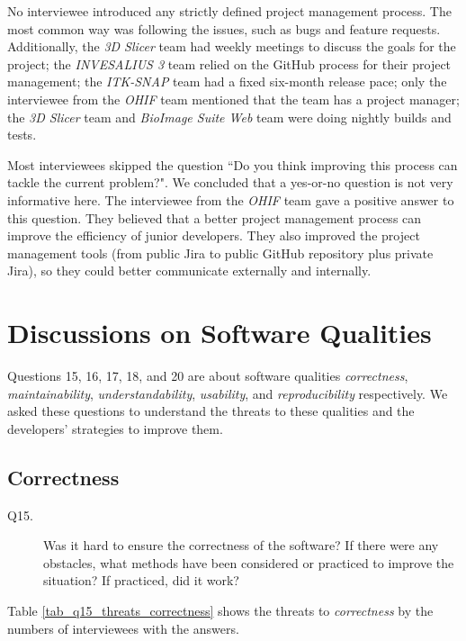 No interviewee introduced any strictly defined project management process. The most common way was following the issues, such as bugs and feature requests. Additionally, the \textit{3D Slicer} team had weekly meetings to discuss the goals for the project; the \textit{INVESALIUS 3} team relied on the GitHub process for their project management; the \textit{ITK-SNAP} team had a fixed six-month release pace; only the interviewee from the \textit{OHIF} team mentioned that the team has a project manager; the \textit{3D Slicer} team and \textit{BioImage Suite Web} team were doing nightly builds and tests.

Most interviewees skipped the question ``Do you think improving this process can tackle the current problem?". We concluded that a yes-or-no question is not very informative here. The interviewee from the \textit{OHIF} team gave a positive answer to this question. They believed that a better project management process can improve the efficiency of junior developers. They also improved the project management tools (from public Jira to public GitHub repository plus private Jira), so they could better communicate externally and internally.

\section{Discussions on Software Qualities}
\label{sec_interview_software_qualities}
Questions 15, 16, 17, 18, and 20 are about software qualities \textit{correctness}, \textit{maintainability}, \textit{understandability}, \textit{usability}, and \textit{reproducibility} respectively. We asked these questions to understand the threats to these qualities and the developers' strategies to improve them.

\subsection{Correctness}

\begin{description}
\item[Q15.] Was it hard to ensure the correctness of the software? If there were any obstacles, what methods have been considered or practiced to improve the situation? If practiced, did it work?
\end{description}

Table \ref{tab_q15_threats_correctness} shows the threats to \textit{correctness} by the numbers of interviewees with the answers.

